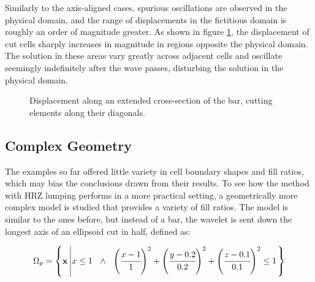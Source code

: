 Similarly to the axis-aligned cases, spurious oscillations are observed in the physical domain, and the range of displacements in the fictitious domain is roughly an order of magnitude greater. As shown in figure \ref{fig:rotated_bar_extended_cross_section}, the displacement of cut cells sharply increases in magnitude in regions opposite the physical domain. The solution in these areas vary greatly across adjacent cells and oscillate seemingly indefinitely after the wave passes, disturbing the solution in the physical domain.

\begin{figure}[!h]
	\centering
	\begin{subfigure}{0.49\textwidth}
		\centering
	\end{subfigure}
	\hfill
	\begin{subfigure}{0.49\textwidth}
		\centering
	\end{subfigure}
	\caption{Displacement along an extended cross-section of the bar, cutting elements along their diagonals.}
	\label{fig:rotated_bar_extended_cross_section}
\end{figure}

%
\subsection{Complex Geometry}
\label{section:complex_geometry}
%

The examples so far offered little variety in cell boundary shapes and fill ratios, which may bias the conclusions drawn from their results. To see how the method with HRZ lumping performs in a more practical setting, a geometrically more complex model is studied that provides a variety of fill ratios. The model is similar to the ones before, but instead of a bar, the wavelet is sent down the longest axis of an ellipsoid cut in half, defined as:

\begin{equation} \label{eq:ellipsoid_definition}
	\Omega_p = \left\{
		\mathbf x \left|
			x \leq 1
			\ \ \land \ \
			\left( \cfrac{x-1}{1} \right)^2
			+ \left( \cfrac{y-0.2}{0.2} \right)^2
			+ \left( \cfrac{z-0.1}{0.1} \right)^2
			\leq 1
		\right.
	\right\}
\end{equation}

